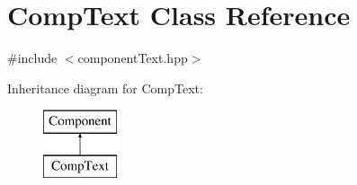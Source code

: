 \hypertarget{class_comp_text}{\section{Comp\-Text Class Reference}
\label{class_comp_text}
}


{\ttfamily \#include $<$component\-Text.\-hpp$>$}

Inheritance diagram for Comp\-Text\-:\begin{figure}[H]
\begin{center}
\leavevmode
\includegraphics[height=2.000000cm]{class_comp_text}
\end{center}
\end{figure}
